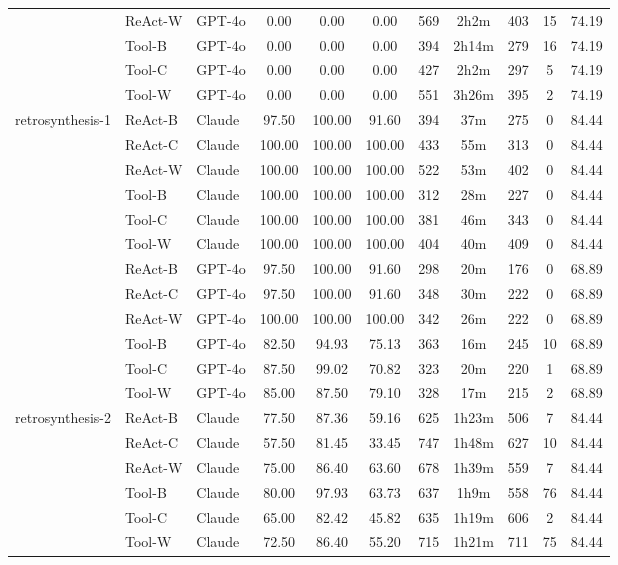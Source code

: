 \begin{longtable}{lllcccccccc}
 & ReAct-W & GPT-4o & 0.00 & 0.00 & 0.00 & 569 & 2h2m & 403 & 15 & 74.19 \\
 & Tool-B & GPT-4o & 0.00 & 0.00 & 0.00 & 394 & 2h14m & 279 & 16 & 74.19 \\
 & Tool-C & GPT-4o & 0.00 & 0.00 & 0.00 & 427 & 2h2m & 297 & 5 & 74.19 \\
 & Tool-W & GPT-4o & 0.00 & 0.00 & 0.00 & 551 & 3h26m & 395 & 2 & 74.19 \\
retrosynthesis-1 & ReAct-B & Claude & 97.50 & 100.00 & 91.60 & 394 & 37m & 275 & 0 & 84.44 \\
 & ReAct-C & Claude & 100.00 & 100.00 & 100.00 & 433 & 55m & 313 & 0 & 84.44 \\
 & ReAct-W & Claude & 100.00 & 100.00 & 100.00 & 522 & 53m & 402 & 0 & 84.44 \\
 & Tool-B & Claude & 100.00 & 100.00 & 100.00 & 312 & 28m & 227 & 0 & 84.44 \\
 & Tool-C & Claude & 100.00 & 100.00 & 100.00 & 381 & 46m & 343 & 0 & 84.44 \\
 & Tool-W & Claude & 100.00 & 100.00 & 100.00 & 404 & 40m & 409 & 0 & 84.44 \\
 & ReAct-B & GPT-4o & 97.50 & 100.00 & 91.60 & 298 & 20m & 176 & 0 & 68.89 \\
 & ReAct-C & GPT-4o & 97.50 & 100.00 & 91.60 & 348 & 30m & 222 & 0 & 68.89 \\
 & ReAct-W & GPT-4o & 100.00 & 100.00 & 100.00 & 342 & 26m & 222 & 0 & 68.89 \\
 & Tool-B & GPT-4o & 82.50 & 94.93 & 75.13 & 363 & 16m & 245 & 10 & 68.89 \\
 & Tool-C & GPT-4o & 87.50 & 99.02 & 70.82 & 323 & 20m & 220 & 1 & 68.89 \\
 & Tool-W & GPT-4o & 85.00 & 87.50 & 79.10 & 328 & 17m & 215 & 2 & 68.89 \\
retrosynthesis-2 & ReAct-B & Claude & 77.50 & 87.36 & 59.16 & 625 & 1h23m & 506 & 7 & 84.44 \\
 & ReAct-C & Claude & 57.50 & 81.45 & 33.45 & 747 & 1h48m & 627 & 10 & 84.44 \\
 & ReAct-W & Claude & 75.00 & 86.40 & 63.60 & 678 & 1h39m & 559 & 7 & 84.44 \\
 & Tool-B & Claude & 80.00 & 97.93 & 63.73 & 637 & 1h9m & 558 & 76 & 84.44 \\
 & Tool-C & Claude & 65.00 & 82.42 & 45.82 & 635 & 1h19m & 606 & 2 & 84.44 \\
 & Tool-W & Claude & 72.50 & 86.40 & 55.20 & 715 & 1h21m & 711 & 75 & 84.44 \\

\end{longtable}
